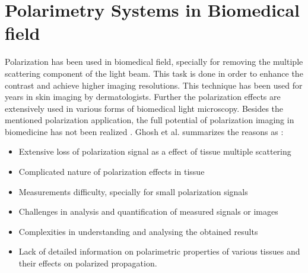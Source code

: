 \documentclass[oneside,a4,12p]{report} %
\begin{document}



\section{Polarimetry Systems in Biomedical field}
\label{polState}

Polarization has been used in biomedical field, specially for removing the multiple scattering component of the light beam. This task is done in order to enhance the contrast and achieve higher imaging resolutions. This technique has been used for years in skin imaging by dermatologists. Further the polarization effects are extensively used in various forms of biomedical light microscopy. Besides the mentioned polarization application, the full potential of polarization imaging in biomedicine has not been realized \cite{ghosh2011tissue}. Ghosh et al. \cite{ghosh2011tissue} summarizes the reasons as : 
	\begin{itemize}
	\item Extensive loss of polarization signal as a effect of tissue multiple scattering 
	\item Complicated nature of polarization effects in tissue
	\item Measurements difficulty, specially for small polarization signals
	\item Challenges in analysis and quantification of measured signals or images 
	\item Complexities in understanding and analysing the obtained results 
	\item Lack of detailed information on polarimetric properties of various tissues and their effects on polarized propagation.
	\end{itemize}
	
\end{document}
